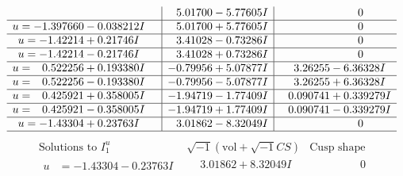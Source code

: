 \documentclass[1p]{elsarticle_modified}
\theoremstyle{definition}
\newcommand{\I}{\sqrt{-1}}
\begin{document}
$$\begin{array}{c|c|c}
 & \phantom{-}5.01700 - 5.77605 I & \phantom{-0.000000 } 0 \\ \hline\begin{aligned}
u &= -1.397660 - 0.038212 I\end{aligned}
 & \phantom{-}5.01700 + 5.77605 I & \phantom{-0.000000 } 0 \\ \hline\begin{aligned}
u &= -1.42214 + 0.21746 I\end{aligned}
 & \phantom{-}3.41028 - 0.73286 I & \phantom{-0.000000 } 0 \\ \hline\begin{aligned}
u &= -1.42214 - 0.21746 I\end{aligned}
 & \phantom{-}3.41028 + 0.73286 I & \phantom{-0.000000 } 0 \\ \hline\begin{aligned}
u &= \phantom{-}0.522256 + 0.193380 I\end{aligned}
 & -0.79956 + 5.07877 I & \phantom{-}3.26255 - 6.36328 I \\ \hline\begin{aligned}
u &= \phantom{-}0.522256 - 0.193380 I\end{aligned}
 & -0.79956 - 5.07877 I & \phantom{-}3.26255 + 6.36328 I \\ \hline\begin{aligned}
u &= \phantom{-}0.425921 + 0.358005 I\end{aligned}
 & -1.94719 - 1.77409 I & \phantom{-}0.090741 + 0.339279 I \\ \hline\begin{aligned}
u &= \phantom{-}0.425921 - 0.358005 I\end{aligned}
 & -1.94719 + 1.77409 I & \phantom{-}0.090741 - 0.339279 I \\ \hline\begin{aligned}
u &= -1.43304 + 0.23763 I\end{aligned}
 & \phantom{-}3.01862 - 8.32049 I & \phantom{-0.000000 } 0\\
 \hline 
 \end{array}$$\newpage$$\begin{array}{c|c|c}  
\text{Solutions to }I^u_{1}& \I (\text{vol} + \sqrt{-1}CS) & \text{Cusp shape}\\
 \hline 
\begin{aligned}
u &= -1.43304 - 0.23763 I\end{aligned}
 & \phantom{-}3.01862 + 8.32049 I & \phantom{-0.000000 } 0 \\ \hline\begin{aligned}

\end{aligned}
\end{array}$$
\end{document}
